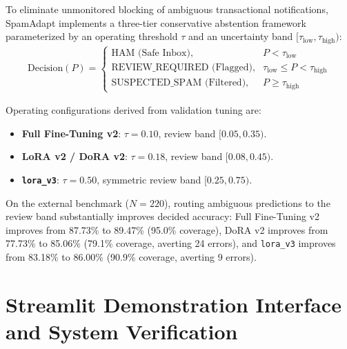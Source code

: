 \documentclass[conference]{IEEEtran}
\begin{document}
To eliminate unmonitored blocking of ambiguous transactional notifications, SpamAdapt implements a three-tier conservative abstention framework parameterized by an operating threshold $\tau$ and an uncertainty band $[\tau_{\text{low}}, \tau_{\text{high}})$:
\begin{align}
    \text{Decision}(P) = 
    \begin{cases}
        \text{HAM (Safe Inbox)}, & P < \tau_{\text{low}} \\
        \text{REVIEW\_REQUIRED (Flagged)}, & \tau_{\text{low}} \le P < \tau_{\text{high}} \\
        \text{SUSPECTED\_SPAM (Filtered)}, & P \ge \tau_{\text{high}}
    \end{cases}
    \label{eq:abstention}
\end{align}

Operating configurations derived from validation tuning are:
\begin{itemize}
    \item \textbf{Full Fine-Tuning v2}: $\tau = 0.10$, review band $[0.05, 0.35)$.
    \item \textbf{LoRA v2 / DoRA v2}: $\tau = 0.18$, review band $[0.08, 0.45)$.
    \item \textbf{\texttt{lora\_v3}}: $\tau = 0.50$, symmetric review band $[0.25, 0.75)$.
\end{itemize}

On the external benchmark ($N=220$), routing ambiguous predictions to the review band substantially improves decided accuracy: Full Fine-Tuning v2 improves from 87.73\% to 89.47\% (95.0\% coverage), DoRA v2 improves from 77.73\% to 85.06\% (79.1\% coverage, averting 24 errors), and \texttt{lora\_v3} improves from 83.18\% to 86.00\% (90.9\% coverage, averting 9 errors).

\section{Streamlit Demonstration Interface and System Verification}
\label{sec:demo_interface}
\end{document}
